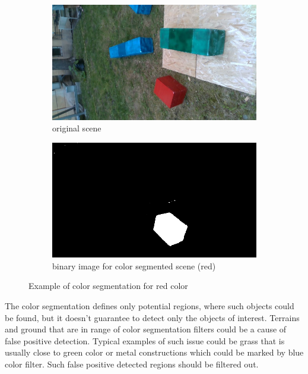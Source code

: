 \documentclass{ctuthesis}
\begin{document}
\begin{figure}[htbp]
     \centering
     \begin{subfigure}{0.475\textwidth}
         \centering
         \includegraphics[width=\textwidth]{1.1.jpg}
         \caption{original scene}
         \label{fig:2-1-a}
     \end{subfigure}
     \hfill
     \begin{subfigure}{0.475\textwidth}
         \centering
         \includegraphics[width=\textwidth]{red_segmented.png}
         \caption{binary image for color segmented scene (red)}
         \label{fig:2-1-b}
     \end{subfigure}

        \caption{Example of color segmentation for red color}
        \label{fig:2-1}
\end{figure}

The color segmentation defines only potential regions, where such objects could be found, but it doesn't guarantee to detect only the objects of interest. Terrains and ground that are in range of color segmentation filters could be a cause of false positive detection. Typical examples of such issue could be grass that is usually close to green color or metal constructions which could be marked by blue color filter. Such false positive detected regions should be filtered out.
\end{document}
